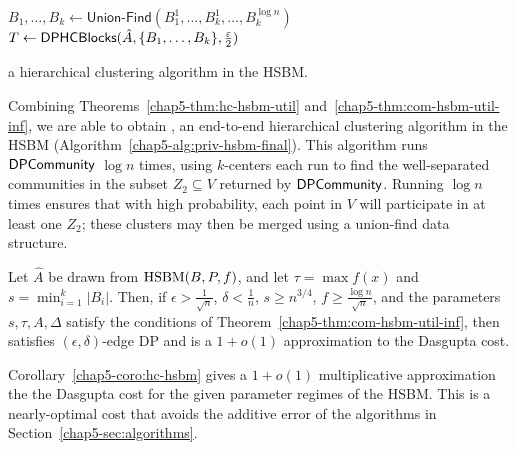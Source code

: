 \begin{algorithm}
$B_1, \ldots, B_k \gets \textsf{Union-Find}(B_1^1, \ldots, B_k^1, \ldots, B_k^{\log n})$\;
$T \gets \textsf{DPHCBlocks}{}(\hat{A}, \{B_1, \ldots, B_k\}, \frac{\varepsilon}{2})$\;
\caption[\dphchsbm{}, a hierarchical clustering algorithm in the hierarchiacl stochastic block model.]{\dphchsbm{} a hierarchical clustering algorithm in the HSBM.}\label{chap5-alg:priv-hsbm-final}
\end{algorithm}

Combining Theorems~\ref{chap5-thm:hc-hsbm-util} and~\ref{chap5-thm:com-hsbm-util-inf}, we are able to obtain \dphchsbm{}, an end-to-end hierarchical clustering algorithm in the HSBM (Algorithm~\ref{chap5-alg:priv-hsbm-final}). This algorithm runs $\textsf{DPCommunity}{}$ $\log n$ times, using $k$-centers each run to find the well-separated communities in the subset $Z_2 \subseteq V$ returned by $\textsf{DPCommunity}{}$. Running $\log n$ times ensures that with high probability, each point in $V$ will participate in at least one $Z_2$; these clusters may then be merged using a union-find data structure.
\begin{coro}\label{chap5-coro:hc-hsbm}
    Let $\hat{A}$ be drawn from $\textnormal{HSBM}(B,P,f)$, and let $\tau = \max f(x)$ and $s = \min_{i=1}^k|B_i|$. Then, if $\epsilon > \frac{1}{\sqrt{n}}$, $\delta < \frac{1}{n}$, $s \geq n^{3/4}$, $f \geq \frac{\log n}{\sqrt{n}}$, and the parameters $s,\tau,A,\Delta$ satisfy the conditions of Theorem~\ref{chap5-thm:com-hsbm-util-inf}, then \dphchsbm{} satisfies $(\epsilon, \delta)$-edge DP and is a $1+o(1)$ approximation to the Dasgupta cost. 
\end{coro}
Corollary~\ref{chap5-coro:hc-hsbm} gives a $1+o(1)$ multiplicative approximation the the Dasgupta cost for the given parameter regimes of the HSBM. This is a nearly-optimal cost that avoids the additive error of the algorithms in Section~\ref{chap5-sec:algorithms}.
